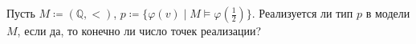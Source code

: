 Пусть $M \coloneqq (\mathbb{Q}, <)$, $p \coloneqq \{\varphi(v) \mid M \models
\varphi\left(\frac{1}{2}\right)\}$. Реализуется ли тип $p$ в модели $M$, если да, то конечно ли число
точек реализации?